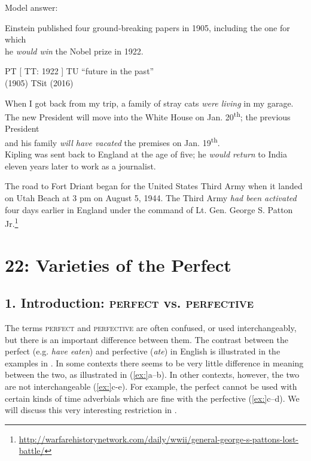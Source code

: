 \sffamily
Model answer:

\textsf{Einstein published four ground-breaking papers in 1905, including the one for which\\
  he} \textsf{\textit{would win}}\textsf{ the Nobel prize in 1922.}

\ea
    PT  [  TT: 1922  ]  TU     “future in the past”\\
  (1905)    \textbf{{\textbar}}TSit\textbf{{\textbar}}    (2016)


\ea When I got back from my trip, a family of stray cats \textit{were living} in my garage.\\
\ex The new President will move into the White House on Jan. 20\textsuperscript{th}; the previous President\\
  and his family \textit{will have vacated} the premises on Jan. 19\textsuperscript{th}.\\
\ex Kipling was sent back to England at the age of five; he \textit{would return} to India\\
  eleven years later to work as a journalist.

\ex The road to Fort Driant began for the United States Third Army when it landed on Utah Beach at 3 pm on August 5, 1944. The Third Army \textit{had been activated} four days earlier in England under the command of Lt. Gen. George S. Patton Jr.\footnote{\url{http://warfarehistorynetwork.com/daily/wwii/general-george-s-pattons-lost-battle/}} 
\z
\z

\chapter{{22}: Varieties of the Perfect}

\section{1. Introduction: \textsc{perfect} vs. \textsc{perfective}}\label{sec:}

The terms \textsc{perfect} and \textsc{perfective} are often confused, or used interchangeably, but there is an important difference between them. The contrast between the perfect (e.g. \textit{have eaten}) and perfective (\textit{ate}) in English is illustrated in the examples in . In some contexts there seems to be very little difference in meaning between the two, as illustrated in (\ref{ex:}a--b). In other contexts, however, the two are not interchangeable (\ref{ex:}c-e). For example, the perfect cannot be used with certain kinds of time adverbials which are fine with the perfective (\ref{ex:}c--d). We will discuss this very interesting restriction in .


